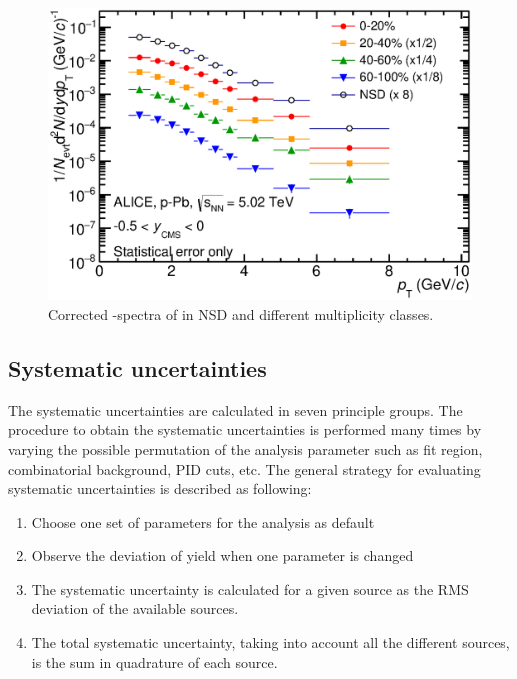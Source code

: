 \begin{figure}[htbp]
\begin{center}
\includegraphics[width=12.0cm]{./Version1/FigChapter5/Spectra/StatSpectra.eps}
\caption{Corrected \pt-spectra of \xis in NSD and different multiplicity classes.} 
 \label{fig:pPb:rawspectra}
\end{center}
\end{figure}




\newpage
\subsection{Systematic uncertainties}\label{sec:pPb:sys} 

The systematic uncertainties are calculated in seven principle groups. The procedure to obtain the systematic uncertainties is performed many times by varying the possible permutation of the analysis parameter such as fit region, combinatorial background, PID cuts, etc. The general strategy for evaluating systematic uncertainties is described as following:

\begin{enumerate}
\item Choose one set of parameters for the analysis as default
\item Observe the deviation of yield when one parameter is changed
\item The systematic uncertainty is calculated for a given source as the RMS deviation of the available sources.
\item The total systematic uncertainty, taking into account all the different sources, is the sum in quadrature of each source.
\end{enumerate}

